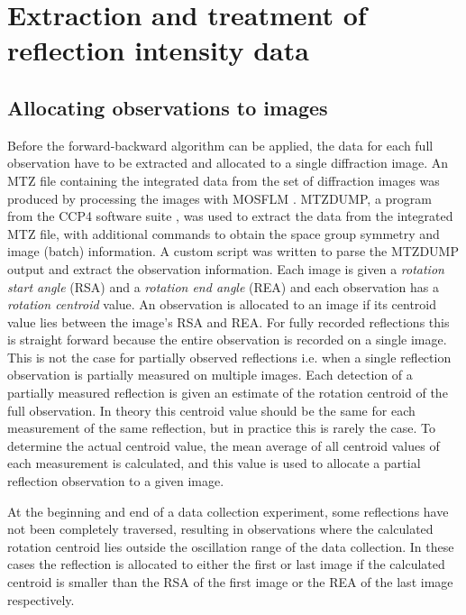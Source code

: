 \section{Extraction and treatment of reflection intensity data}
\label{sec:Extraction and treatment of reflection intensity data}

\subsection{Allocating observations to images}
\label{sub:Allocating observations to images}
Before the forward-backward algorithm can be applied, the data for each full observation have to be extracted and allocated to a single diffraction image.
An MTZ file containing the integrated data from the set of diffraction images was produced by processing the images with MOSFLM \cite{leslie2007}.
MTZDUMP, a program from the CCP4 software suite \cite{winn2011}, was used to extract the data from the integrated MTZ file, with additional commands to obtain the space group symmetry and image (batch) information.
A custom script was written to parse the MTZDUMP output and extract the observation information.
Each image is given a \textit{rotation start angle} (RSA) and a \textit{rotation end angle} (REA) and each observation has a \textit{rotation centroid} value.
An observation is allocated to an image if its centroid value lies between the image's RSA and REA.
For fully recorded reflections this is straight forward because the entire observation is recorded on a single image.
This is not the case for partially observed reflections i.e. when a single reflection observation is partially measured on multiple images.
Each detection of a partially measured reflection is given an estimate of the rotation centroid of the full observation.
In theory this centroid value should be the same for each measurement of the same reflection, but in practice this is rarely the case.
To determine the actual centroid value, the mean average of all centroid values of each measurement is calculated, and this value is used to allocate a partial reflection observation to a given image.

At the beginning and end of a data collection experiment, some reflections have not been completely traversed, resulting in observations where the calculated rotation centroid lies outside the oscillation range of the data collection.
In these cases the reflection is allocated to either the first or last image if the calculated centroid is smaller than the RSA of the first image or the REA of the last image respectively.


